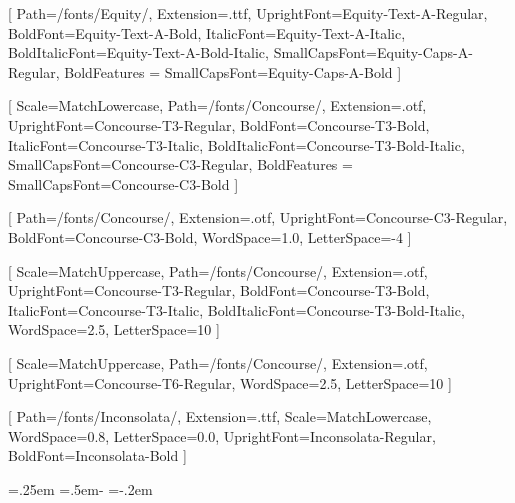 
\setmainfont{Equity-Text-A-Regular}[
    Path=\mainpath/fonts/Equity/,
    Extension=.ttf,
    UprightFont=Equity-Text-A-Regular,
    BoldFont=Equity-Text-A-Bold,
    ItalicFont=Equity-Text-A-Italic,
    BoldItalicFont=Equity-Text-A-Bold-Italic,
    SmallCapsFont=Equity-Caps-A-Regular,
    BoldFeatures = {
        SmallCapsFont=Equity-Caps-A-Bold
    }
]

 \setsansfont{Concourse-T3-Regular}[
     Scale=MatchLowercase,
     Path=\mainpath/fonts/Concourse/,
     Extension=.otf,
     UprightFont=Concourse-T3-Regular,
     BoldFont=Concourse-T3-Bold,
     ItalicFont=Concourse-T3-Italic,
     BoldItalicFont=Concourse-T3-Bold-Italic,
     SmallCapsFont=Concourse-C3-Regular,
     BoldFeatures = {
         SmallCapsFont=Concourse-C3-Bold
     }
 ]

 [
     Path=\mainpath/fonts/Concourse/,
     Extension=.otf,
     UprightFont=Concourse-C3-Regular,
     BoldFont=Concourse-C3-Bold,
     WordSpace=1.0,
     LetterSpace=-4
 ]

 [
     Scale=MatchUppercase,
     Path=\mainpath/fonts/Concourse/,
     Extension=.otf,
     UprightFont=Concourse-T3-Regular,
     BoldFont=Concourse-T3-Bold,
     ItalicFont=Concourse-T3-Italic,
     BoldItalicFont=Concourse-T3-Bold-Italic,
     WordSpace=2.5,
     LetterSpace=10
 ]

 [
     Scale=MatchUppercase,
     Path=\mainpath/fonts/Concourse/,
     Extension=.otf,
     UprightFont=Concourse-T6-Regular,
     WordSpace=2.5,
     LetterSpace=10
 ]

  \setmonofont{Inconsolata}[
      Path=\mainpath/fonts/Inconsolata/,
      Extension=.ttf,
      Scale=MatchLowercase,
      WordSpace=0.8,
      LetterSpace=0.0,
      UprightFont=Inconsolata-Regular,
      BoldFont=Inconsolata-Bold
  ]

 \font=.25em %
 \font=\dimexpr.5em-\font
 \font=\dimexpr{}\font-.2em



